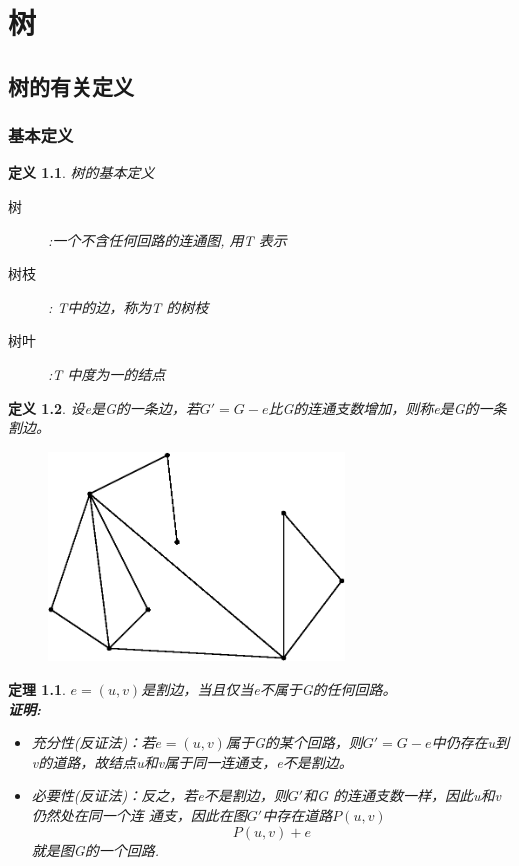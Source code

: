 \documentclass[11pt,a4paper,openany]{book}
\newtheorem{theorem}{\textbf{定理}}[section]
\newtheorem{defination}{\textbf{定义}}[section]
\begin{document}
\chapter{树}
\section{树的有关定义}
\subsection{基本定义}
\begin{defination}
树的基本定义\begin{description}
        \item[树] :一个不含任何回路的连通图, 用T 表示
        \item[树枝]: T中的边，称为T 的树枝
        \item[树叶] :T 中度为一的结点
      \end{description}
\end{defination}
\begin{defination}
设e是G的一条边，若$G'=G-e$比G的连通支数增加，则称e是G的一条割边。\\
\begin{figure}[H]
  \centering
  \includegraphics[width=0.7\textwidth]{3_1.eps}\\
  \caption{}
\end{figure}
\end{defination}
\begin{theorem}
$e=(u,v)$是割边，当且仅当e不属于G的任何回路。\\
\textbf{证明:}\\
\begin{itemize}
  \item 充分性(反证法)：若$e=(u,v)$属于G的某个回路，则$G'=G-e$中仍存在u到v的道路，故结点u和v属于同一连通支，e不是割边。
  \item 必要性(反证法)：反之，若e不是割边，则$G'$和G
的连通支数一样，因此u和v仍然处在同一个连
通支，因此在图$G'$中存在道路$P(u,v)$ $$P(u,v)+e$$就是图G的一个回路.
\end{itemize}
\end{theorem}
\end{document}
